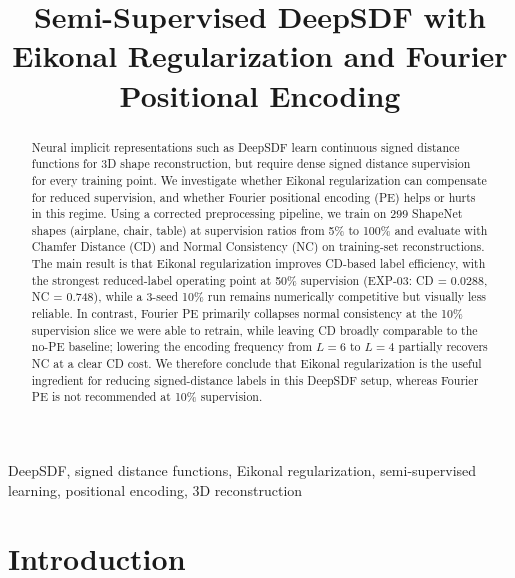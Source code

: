 \documentclass[conference]{IEEEtran}
\begin{document}
\title{Semi-Supervised DeepSDF with Eikonal Regularization and Fourier Positional Encoding}

\author{
}

\maketitle

\begin{abstract}
Neural implicit representations such as DeepSDF learn continuous signed distance functions for 3D shape reconstruction, but require dense signed distance supervision for every training point. We investigate whether Eikonal regularization can compensate for reduced supervision, and whether Fourier positional encoding (PE) helps or hurts in this regime. Using a corrected preprocessing pipeline, we train on 299 ShapeNet shapes (airplane, chair, table) at supervision ratios from 5\% to 100\% and evaluate with Chamfer Distance (CD) and Normal Consistency (NC) on training-set reconstructions. The main result is that Eikonal regularization improves CD-based label efficiency, with the strongest reduced-label operating point at 50\% supervision (EXP-03: CD = 0.0288, NC = 0.748), while a 3-seed 10\% run remains numerically competitive but visually less reliable. In contrast, Fourier PE primarily collapses normal consistency at the 10\% supervision slice we were able to retrain, while leaving CD broadly comparable to the no-PE baseline; lowering the encoding frequency from $L=6$ to $L=4$ partially recovers NC at a clear CD cost. We therefore conclude that Eikonal regularization is the useful ingredient for reducing signed-distance labels in this DeepSDF setup, whereas Fourier PE is not recommended at 10\% supervision.
\end{abstract}

\begin{IEEEkeywords}
DeepSDF, signed distance functions, Eikonal regularization, semi-supervised learning, positional encoding, 3D reconstruction
\end{IEEEkeywords}

\section{Introduction}
\end{document}
